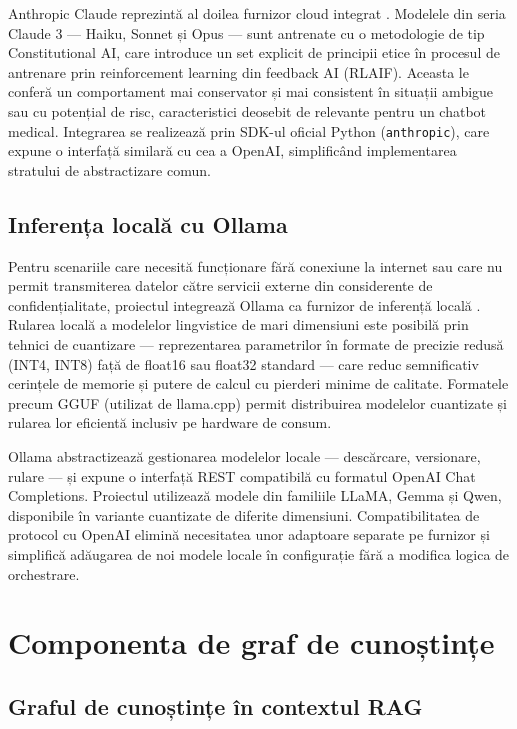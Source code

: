 \documentclass[12pt, a4paper, oneside, romanian]{teza-upb}
\begin{document}
Anthropic Claude reprezintă al doilea furnizor cloud integrat \cite{anthropic_claude}. Modelele din seria Claude 3 — Haiku, Sonnet și Opus — sunt antrenate cu o metodologie de tip Constitutional AI, care introduce un set explicit de principii etice în procesul de antrenare prin reinforcement learning din feedback AI (RLAIF). Aceasta le conferă un comportament mai conservator și mai consistent în situații ambigue sau cu potențial de risc, caracteristici deosebit de relevante pentru un chatbot medical. Integrarea se realizează prin SDK-ul oficial Python (\texttt{anthropic}), care expune o interfață similară cu cea a OpenAI, simplificând implementarea stratului de abstractizare comun.

\subsection{Inferența locală cu Ollama}

Pentru scenariile care necesită funcționare fără conexiune la internet sau care nu permit transmiterea datelor către servicii externe din considerente de confidențialitate, proiectul integrează Ollama ca furnizor de inferență locală \cite{ollama_doc}. Rularea locală a modelelor lingvistice de mari dimensiuni este posibilă prin tehnici de cuantizare — reprezentarea parametrilor în formate de precizie redusă (INT4, INT8) față de float16 sau float32 standard — care reduc semnificativ cerințele de memorie și putere de calcul cu pierderi minime de calitate. Formatele precum GGUF (utilizat de llama.cpp) permit distribuirea modelelor cuantizate și rularea lor eficientă inclusiv pe hardware de consum.

Ollama abstractizează gestionarea modelelor locale — descărcare, versionare, rulare — și expune o interfață REST compatibilă cu formatul OpenAI Chat Completions. Proiectul utilizează modele din familiile LLaMA, Gemma și Qwen, disponibile în variante cuantizate de diferite dimensiuni. Compatibilitatea de protocol cu OpenAI elimină necesitatea unor adaptoare separate pe furnizor și simplifică adăugarea de noi modele locale în configurație fără a modifica logica de orchestrare.

\section{Componenta de graf de cunoștințe}

\subsection{Graful de cunoștințe în contextul RAG}
\end{document}
